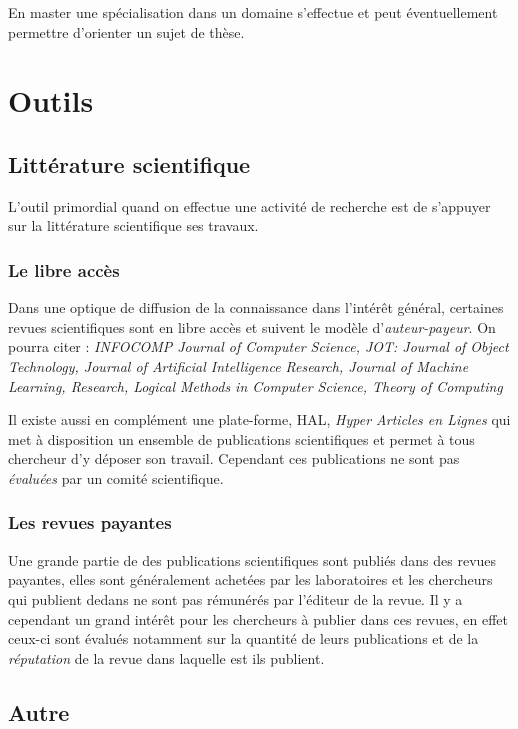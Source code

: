\documentclass[14pt, a4paper]{report}
\begin{document}
    En master une spécialisation dans un domaine s'effectue et peut éventuellement permettre d'orienter un sujet de thèse.

\chapter{Outils}

  \section{Littérature scientifique}

  L'outil primordial quand on effectue une activité de recherche est de s'appuyer sur la littérature scientifique ses travaux.

	  \subsection{Le libre accès}

	  Dans une optique de diffusion de la connaissance dans l'intérêt général, certaines revues scientifiques sont en libre accès et suivent le modèle d'\emph{auteur-payeur}.
	  On pourra citer : \emph{INFOCOMP Journal of Computer Science, JOT: Journal of Object Technology, Journal of Artificial Intelligence Research, Journal of Machine Learning, Research, Logical Methods in Computer Science, Theory of Computing}

	  Il existe aussi en complément une plate-forme, HAL, \emph{Hyper Articles en Lignes} qui met à disposition un ensemble de publications scientifiques et permet à tous chercheur d'y déposer son travail. Cependant ces publications ne sont pas  \emph{évaluées} par un comité scientifique.

	  \subsection{Les revues payantes}

	  Une grande partie de des publications scientifiques sont publiés dans des revues payantes, elles sont généralement achetées par les laboratoires et les chercheurs qui publient dedans ne sont pas rémunérés par l'éditeur de la revue.
	  Il y a cependant un grand intérêt pour les chercheurs à publier dans ces revues, en effet ceux-ci sont évalués notamment sur la quantité de leurs publications et de la \emph{réputation} de la revue dans laquelle est ils publient.

  \section{Autre}
\end{document}
